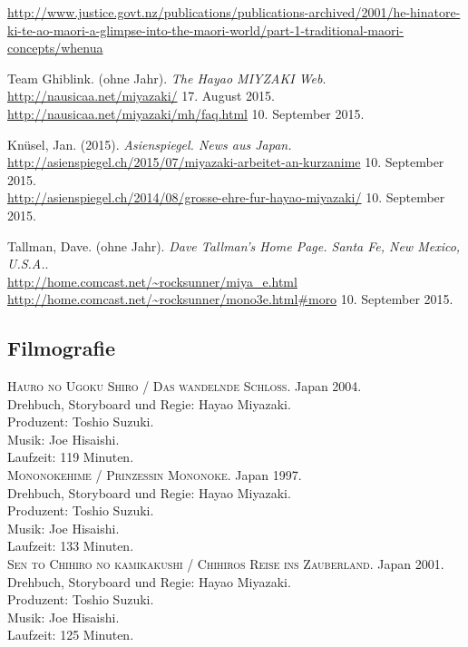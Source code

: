 \documentclass[a4paper]{article}
\begin{document}
\begin{thebibliography}{9}
	\url{http://www.justice.govt.nz/publications/publications-archived/2001/he-hinatore-ki-te-ao-maori-a-glimpse-into-the-maori-world/part-1-traditional-maori-concepts/whenua}	

	Team Ghiblink. (ohne Jahr). \emph{The Hayao MIYZAKI Web}.\\  
	\url{http://nausicaa.net/miyazaki/} 17. August 2015.\\
	\url{http://nausicaa.net/miyazaki/mh/faq.html} 10. September 2015.

	Knüsel, Jan. (2015). \emph{Asienspiegel. News aus Japan.}\\ \url{http://asienspiegel.ch/2015/07/miyazaki-arbeitet-an-kurzanime} 10. September 2015.\\ \url{http://asienspiegel.ch/2014/08/grosse-ehre-fur-hayao-miyazaki/} 10. September 2015.

	Tallman, Dave. (ohne Jahr). \emph{Dave Tallman's Home Page. Santa Fe, New Mexico, U.S.A.}.\\ \url{http://home.comcast.net/~rocksunner/miya_e.html}\\ \url{http://home.comcast.net/~rocksunner/mono3e.html#moro} 10. September 2015.

\subsection*{Filmografie}

	\textsc{Hauro no Ugoku Shiro / Das wandelnde Schloss}.
	Japan 2004. \\
	Drehbuch, Storyboard und Regie: Hayao Miyazaki.\\
	Produzent: Toshio Suzuki. \\
	Musik: Joe Hisaishi. \\
	Laufzeit: 119 Minuten. \\

	\textsc{Mononokehime / Prinzessin Mononoke}.
	Japan 1997. \\
	Drehbuch, Storyboard und Regie: Hayao Miyazaki.\\
	Produzent: Toshio Suzuki. \\
	Musik: Joe Hisaishi. \\
	Laufzeit: 133 Minuten. \\

	\textsc{Sen to Chihiro no kamikakushi / Chihiros Reise ins Zauberland}. Japan 2001. \\
	Drehbuch, Storyboard und Regie: Hayao Miyazaki.\\
	Produzent: Toshio Suzuki. \\
	Musik: Joe Hisaishi. \\
	Laufzeit: 125 Minuten. \\


\end{thebibliography}
\end{document}
